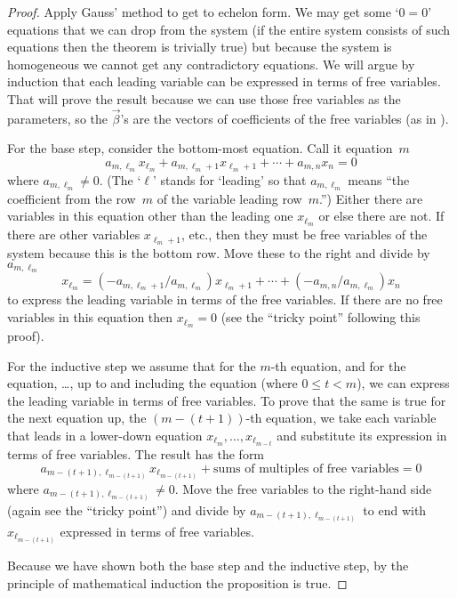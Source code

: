 \begin{proof}
Apply Gauss' method to get to echelon form.
We may get some `\( 0=0 \)' equations that we can drop 
from the system
(if the entire
system consists of such equations then the theorem is trivially true)
but
because the system is homogeneous we cannot get any contradictory equations.
We will argue by induction 
that each leading variable can be expressed in terms of
free variables.
That will prove the result because 
we can use those free variables as the parameters,
so the $\vec{\beta}$'s are the vectors of coefficients of the
free variables 
(as in ). 

For the base step, consider the bottom-most
equation.
Call it equation~$m$
\begin{equation*}
  a_{m,\ell_m}x_{\ell_m}+a_{m,\ell_m+1}x_{\ell_m+1}+\cdots+a_{m,n}x_n=0
\end{equation*}
where \( a_{m,\ell_m}\neq 0 \).
(The `$\ell$' stands for `leading' 
so that $a_{m,\ell_m}$ means ``the coefficient
from the row~$m$ of the variable leading row~$m$.'')
Either there are variables in this equation other than the leading one
$x_{\ell_m}$ or else there are not.
If there are other variables $x_{\ell_{m}+1}$, etc., then they must be
free variables of the system because this is the bottom row. 
Move these to the right and divide by $a_{m,\ell_m}$
\begin{equation*}
  x_{\ell_m}
  =(-a_{m,\ell_m+1}/a_{m,\ell_m})x_{\ell_m+1}+\cdots+(-a_{m,n}/a_{m,\ell_m})x_n
\end{equation*}
to express the leading variable in terms of the free variables.
If there are no free variables in this equation 
then \( x_{\ell_m}=0 \) (see the
``tricky point'' following this proof).

For the inductive step we assume
that for the \( m \)-th equation,
and for the 
equation, \ldots, up to and including the  equation
(where \( 0\leq t<m \)), 
we can
express the leading variable in terms of free variables.
To prove that the same is true for the next equation up, 
the \( (m-(t+1)) \)-th equation, we take each variable that leads
in a lower-down equation \( x_{\ell_m},\ldots,x_{\ell_{m-t}} \) and substitute
its expression in terms of free variables.
The result has the form
\begin{equation*}
  a_{m-(t+1),\ell_{m-(t+1)}}x_{\ell_{m-(t+1)}}+
    \text{sums of multiples of free variables}=0
\end{equation*}
where \( a_{m-(t+1),\ell_{m-(t+1)}}\neq 0 \).
Move the free variables to
the right-hand side (again see the ``tricky point'') and divide by
\( a_{m-(t+1),\ell_{m-(t+1)}} \) to end with
\( x_{\ell_{m-(t+1)}} \) expressed in terms of free variables.

Because we have shown both the base step and the inductive step, by the
principle of mathematical induction the proposition is true.
\end{proof}

